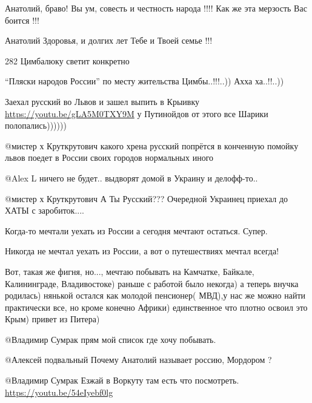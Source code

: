 \begin{multicols}{2}

Анатолий, браво! Вы ум, совесть и честность народа !!!! Как же эта мерзость Вас
боится !!!


Анатолий Здоровья, и долгих лет Тебе и Твоей семье !!!

\begin{itemize} %


282 Цимбалюку светит конкретно

\enquote{Пляски народов России} по месту жительства Цимбы..!!!..))
Ахха ха..!!..))


Заехал русский во Львов и зашел выпить в Крыивку \url{https://youtu.be/gLA5M0TXY9M} у
Путинойдов от этого все Шарики полопались))))))

 @мистер х Круткрутович  какого хрена русский попрётся в конченную
помойку львов поедет 
в  России своих городов нормальных иного

 @Alex L    ничего  не будет.. выдворят домой в Украину  и делофф-то..

 @мистер х Круткрутович  А Ты Русский??? Очередной Украинец приехал до ХАТЫ с заробиток....
\end{itemize} %

Когда-то  мечтали уехать из России а сегодня мечтают остаться. Супер.

\begin{itemize} %

Никогда не мечтал уехать из России, а вот о путешествиях мечтал всегда!


Вот, такая же фигня, но..., мечтаю побывать на
Камчатке, Байкале, Калининграде, Владивостоке) раньше с работой было некогда) а
теперь внучка родилась) нянькой остался как молодой пенсионер( МВД),у нас же
можно найти практически все, но кроме конечно Африки) единственное что плотно
освоил это Крым) привет из Питера)

 @Владимир Сумрак  прям мой список где хочу побывать.

 @Алексей подвальный  Почему Анатолий называет россию, Мордором ?

 @Владимир Сумрак  Езжай в Воркуту там есть что посмотреть. \url{https://youtu.be/54eIyebf0lg}


\end{itemize}
\end{multicols}
